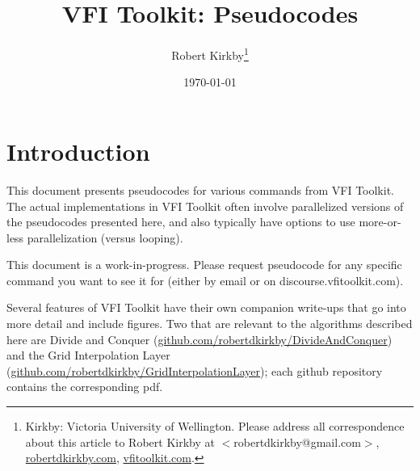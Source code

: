 \documentclass[11pt,fleqn]{article}
\begin{document}
\newcommand{\rob}[1]{{\noindent\color{blue}\bf #1}}
\newcommand{\robc}[1]{{\noindent\color{blue}\bf R: #1}}

\title{VFI Toolkit: Pseudocodes}
\author{Robert Kirkby\thanks{Kirkby: Victoria University of Wellington.
Please address all correspondence about this article to Robert Kirkby at $<$robertdkirkby@gmail.com$>$,
\href{http://www.robertdkirkby.com}{robertdkirkby.com}, \href{http://www.vfitoolkit.com}{vfitoolkit.com}.
}} %
\date{\today}
\maketitle



\thispagestyle{empty}

\newpage
{
\small
\parskip=0cm
\parindent=0cm
\tableofcontents
}


\newpage
\baselineskip=17pt
\setcounter{page}{1}

\section{Introduction}
This document presents pseudocodes for various commands from VFI Toolkit. The actual implementations in VFI Toolkit often involve parallelized versions of the pseudocodes presented here, and also typically have options to use more-or-less parallelization (versus looping).

This document is a work-in-progress. Please request pseudocode for any specific command you want to see it for (either by email or on discourse.vfitoolkit.com).

Several features of VFI Toolkit have their own companion write-ups that go into more detail and include figures. Two that are relevant to the algorithms described here are Divide and Conquer (\href{https://github.com/robertdkirkby/DivideAndConquer}{github.com/robertdkirkby/DivideAndConquer}) and the Grid Interpolation Layer (\href{https://github.com/robertdkirkby/GridInterpolationLayer}{github.com/robertdkirkby/GridInterpolationLayer}); each github repository contains the corresponding pdf.
\end{document}
